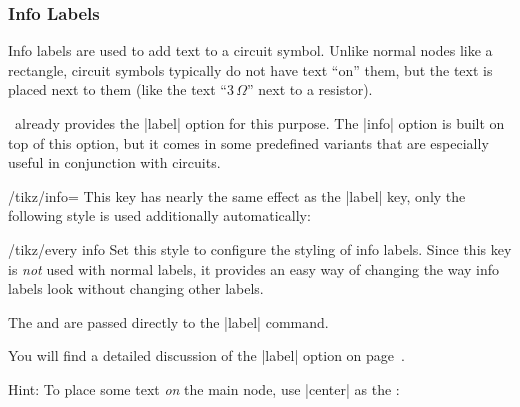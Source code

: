 \subsubsection{Info Labels}

Info labels are used to add text to a circuit symbol. Unlike normal nodes like
a rectangle, circuit symbols typically do not have text ``on'' them, but the
text is placed next to them (like the text ``$3\,\Omega$'' next to a resistor).

\tikzname\ already provides the |label| option for this purpose. The |info|
option is built on top of this option, but it comes in some predefined variants
that are especially useful in conjunction with circuits.

\begin{key}{/tikz/info=}
    This key has nearly the same effect as the |label| key, only the following
    style is used additionally automatically:
    \begin{stylekey}{/tikz/every info}
        Set this style to configure the styling of info labels. Since this
        key is \emph{not} used with normal labels, it provides an easy way
        of changing the way info labels look without changing other
        labels.
    \end{stylekey}
    The  and  are passed directly to the |label|
    command.
\begin{codeexample}[preamble={\usetikzlibrary{circuits.ee.IEC}}]
\begin{tikzpicture}[circuit ee IEC,every info/.style=red]
  \node [resistor,info=$3\Omega$] {};
\end{tikzpicture}
\end{codeexample}

    You will find a detailed discussion of the |label| option on
    page~\pageref{label-option}.

    Hint: To place some text \emph{on} the main node, use |center| as the
    :
\begin{codeexample}[preamble={\usetikzlibrary{circuits.ee.IEC}}]
\end{codeexample}
\end{key}

